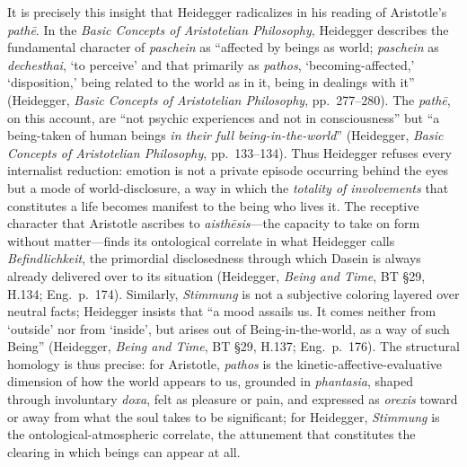 It is precisely this insight that Heidegger radicalizes in his reading of Aristotle's \textit{pathē}. In the \textit{Basic Concepts of Aristotelian Philosophy}, Heidegger describes the fundamental character of \textit{paschein} as ``affected by beings as world; \textit{paschein} as \textit{dechesthai}, `to perceive' and that primarily as \textit{pathos}, `becoming-affected,' `disposition,' being related to the world as in it, being in dealings with it'' (Heidegger, \textit{Basic Concepts of Aristotelian Philosophy}, pp.~277--280). The \textit{pathē}, on this account, are ``not psychic experiences and not in consciousness'' but ``a being-taken of human beings \textit{in their full being-in-the-world}'' (Heidegger, \textit{Basic Concepts of Aristotelian Philosophy}, pp.~133--134). Thus Heidegger refuses every internalist reduction: emotion is not a private episode occurring behind the eyes but a mode of world-disclosure, a way in which the \textit{totality of involvements} that constitutes a life becomes manifest to the being who lives it. The receptive character that Aristotle ascribes to \textit{aisthēsis}---the capacity to take on form without matter---finds its ontological correlate in what Heidegger calls \textit{Befindlichkeit}, the primordial disclosedness through which Dasein is always already delivered over to its situation (Heidegger, \textit{Being and Time}, BT \S29, H.134; Eng.~p.~174). Similarly, \textit{Stimmung} is not a subjective coloring layered over neutral facts; Heidegger insists that ``a mood assails us. It comes neither from `outside' nor from `inside', but arises out of Being-in-the-world, as a way of such Being'' (Heidegger, \textit{Being and Time}, BT \S29, H.137; Eng.~p.~176). The structural homology is thus precise: for Aristotle, \textit{pathos} is the kinetic-affective-evaluative dimension of how the world appears to us, grounded in \textit{phantasia}, shaped through involuntary \textit{doxa}, felt as pleasure or pain, and expressed as \textit{orexis} toward or away from what the soul takes to be significant; for Heidegger, \textit{Stimmung} is the ontological-atmospheric correlate, the attunement that constitutes the clearing in which beings can appear at all.


